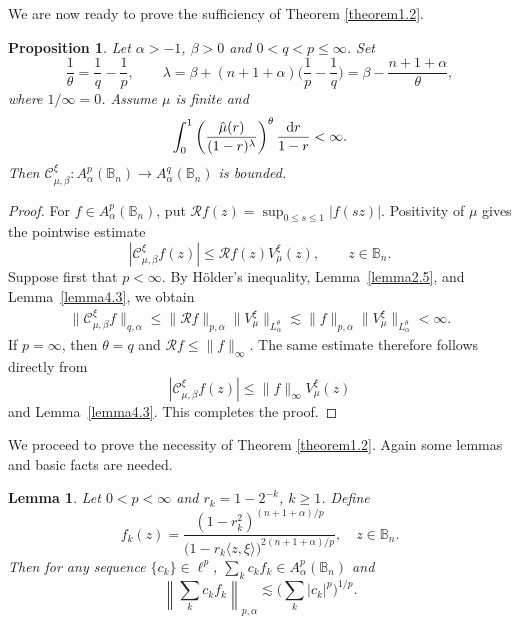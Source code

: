 \documentclass[preprint,12pt,times]{elsarticle}
\newtheorem{lemma}[theorem]{Lemma}
\newtheorem{proposition}[theorem]{Proposition}
\theoremstyle{definition}
\theoremstyle{remark}
\numberwithin{equation}{section}
\begin{document}
We are now ready to prove the sufficiency of Theorem \ref{theorem1.2}.


\begin{proposition}\label{proposition4.4}
Let $\alpha>-1$, $\beta>0$ and   $0<q<p\leq\infty$. Set
\[
    \frac{1}{\theta}=\frac{1}q-\frac{1}p,
    \qquad
    \lambda=\beta+(n+1+\alpha)\Big(\frac{1}{p}-\frac{1}{q}\Big)
    =\beta-\frac{n+1+\alpha}{\theta},
\] 
 where $1/\infty=0$.  Assume $\mu$ is finite and
\[
    \int_{0}^{1}\left(\frac{\hat{\mu}(r)}{(1-r)^{\lambda}}\right)^{\theta}\frac{{\rm d}r}{1-r}<\infty.
\]
Then  $\mathcal{C}_{\mu,\beta}^{\xi}: A_{\alpha}^p(\mathbb{B}_n)\to A_{\alpha}^q(\mathbb{B}_n)$ is bounded. \end{proposition}

\begin{proof}
For $f\in A_\alpha^p(\mathbb B_n)$, put
$\mathcal Rf(z)=\sup_{0\leq s\leq1}|f(sz)|$. Positivity of $\mu$ gives the
pointwise estimate
\[
  |\mathcal C_{\mu,\beta}^{\xi}f(z)|
  \leq \mathcal Rf(z)V_\mu^\xi(z),
  \qquad z\in\mathbb B_n.
\]
Suppose first that $p<\infty$. By H\"older's inequality,
Lemma~\ref{lemma2.5}, and Lemma~\ref{lemma4.3}, we obtain
\[
\begin{split}
  \|\mathcal C_{\mu,\beta}^{\xi}f\|_{q,\alpha}
  \leq \|\mathcal Rf\|_{p,\alpha}
     \|V_\mu^\xi\|_{L_\alpha^\theta} \lesssim \|f\|_{p,\alpha}\|V_\mu^\xi\|_{L_\alpha^\theta}<\infty.
\end{split}
\]
If $p=\infty$, then $\theta=q$ and $\mathcal Rf\leq\|f\|_\infty$.
The same estimate therefore follows directly from
\[
  |\mathcal C_{\mu,\beta}^{\xi}f(z)|
  \leq\|f\|_\infty V_\mu^\xi(z)
\]
and Lemma~\ref{lemma4.3}. This completes the proof.
\end{proof}


We proceed to prove the necessity of Theorem \ref{theorem1.2}. Again some lemmas and basic facts are needed.

\begin{lemma}\label{lemma4.5}
Let   $0<p<\infty$  and $r_k=1-2^{-k}$, $k\geq 1$. Define
\begin{equation*}
f_k(z)=\frac{(1-r_k^2)^{(n+1+\alpha)/p}}{\big(1-r_k\langle z,\xi\rangle\big)^{2(n+1+\alpha)/p}},\quad z\in\mathbb{B}_n.
\end{equation*}
Then for any sequence $\{c_k\}\in \ell^p$, $\sum\limits_kc_kf_k\in A_{\alpha}^p(\mathbb{B}_n)$ and 
\[
    \left\|\sum_{k}c_kf_k\right\|_{p,\alpha}\lesssim \Big(\sum_{k}|c_k|^p\Big)^{1/p}.
\]
\end{lemma}
\end{document}
